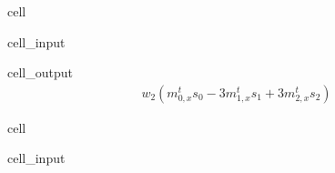 \documentclass[letterpaper,10pt,english,openany,oneside]{jupyterBook}
\begin{document}
\begin{sphinxuseclass}{cell}\begin{sphinxVerbatimInput}

\begin{sphinxuseclass}{cell_input}
\begin{sphinxVerbatim}[commandchars=\\\{\}]
\PYG{p}{[}\PYG{p}{]}
\end{sphinxVerbatim}

\end{sphinxuseclass}\end{sphinxVerbatimInput}
\begin{sphinxVerbatimOutput}

\begin{sphinxuseclass}{cell_output}\begin{equation*}
\begin{split}\displaystyle w_{2} \left(m_{0,x}^{t} s_{0} - 3 m_{1,x}^{t} s_{1} + 3 m_{2,x}^{t} s_{2}\right)\end{split}
\end{equation*}
\end{sphinxuseclass}\end{sphinxVerbatimOutput}

\end{sphinxuseclass}
\begin{sphinxuseclass}{cell}\begin{sphinxVerbatimInput}

\begin{sphinxuseclass}{cell_input}
\begin{sphinxVerbatim}[commandchars=\\\{\}]
  \PYG{p}{[}  \PYG{p}{]}
  \PYG{p}{[}  \PYG{p}{]}
 \PYG{p}{[}  \PYG{p}{]}
   
    \PYG{p}{[}\PYG{p}{]}  \PYG{p}{[}\PYG{p}{]}  \PYG{p}{[}\PYG{p}{]}  \PYG{p}{[}\PYG{p}{]}  \PYG{p}{[}\PYG{p}{]}  \PYG{p}{[}\PYG{p}{]}
    \PYG{p}{[}\PYG{p}{]}  \PYG{p}{[}\PYG{p}{]}  \PYG{p}{[}\PYG{p}{]}  \PYG{p}{[}\PYG{p}{]}
\end{sphinxVerbatim}

\end{sphinxuseclass}\end{sphinxVerbatimInput}

\end{sphinxuseclass}
\end{document}
